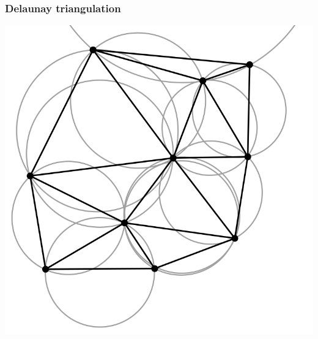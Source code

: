 \documentclass{beamer}
\begin{document}
\begin{frame}
  \frametitle{Delaunay triangulation}
  \begin{center}
    \includegraphics[width=0.8\textheight]{delaunay_simple.png}
  \end{center}
\end{frame}
\end{document}
